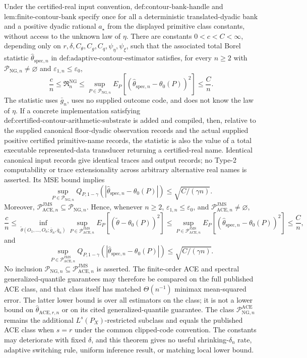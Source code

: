 Under the certified-real input convention, \(\text{def:contour-bank-handle}\) and \(\text{lem:finite-contour-bank}\) specify once for all a deterministic translated-dyadic bank and a positive dyadic rational \(a_{\star}\) from the displayed primitive class constants, without access to the unknown law of \(\eta\). There are constants \(0<c<C<\infty\), depending only on \(r,\delta,C_{\theta},C_g,C_q,\psi_{\eta},\psi_{\xi}\), such that the associated total Borel statistic \(\widehat\theta_{\mathrm{spec},n}\) in \(\text{def:adaptive-contour-estimator}\) satisfies, for every \(n\ge2\) with \(\mathcal P_{\mathrm{NG},n}\neq\varnothing\) and \(\varepsilon_{1,n}\le\varepsilon_0\),
\[
 \frac cn\le\mathfrak R_n^{\mathrm{NG}}
 \le\sup_{P\in\mathcal P_{\mathrm{NG},n}}
 E_P[(\widehat\theta_{\mathrm{spec},n}-\theta_0(P))^2]
 \le\frac Cn.
\]
The statistic uses \(\bar g_n\), uses no supplied outcome code, and does not know the law of \(\eta\). If a concrete implementation satisfying \(\text{def:certified-contour-arithmetic-substrate}\) is added and compiled, then, relative to the supplied canonical floor-dyadic observation records and the actual supplied positive certified primitive-name records, the statistic is also the value of a total executable represented-data transducer returning a certified-real name. Identical canonical input records give identical traces and output records; no Type-2 computability or trace extensionality across arbitrary alternative real names is asserted. Its MSE bound implies
\[
 \sup_{P\in\mathcal P_{\mathrm{NG},n}}
 Q_{P,1-\gamma}(|\widehat\theta_{\mathrm{spec},n}-\theta_0(P)|)
 \le\sqrt{C/(\gamma n)}.
\]
Moreover, \(\mathcal P_{\mathrm{ACE},n}^{\mathrm{JMS}}\subseteq\mathcal P_{\mathrm{NG},n}\). Hence, whenever \(n\ge2\), \(\varepsilon_{1,n}\le\varepsilon_0\), and \(\mathcal P_{\mathrm{ACE},n}^{\mathrm{JMS}}\neq\varnothing\),
\[
 \frac cn
 \le
 \inf_{\widetilde\theta(O_1,\ldots,O_n;\bar g_n,\bar q_n)}
 \sup_{P\in\mathcal P_{\mathrm{ACE},n}^{\mathrm{JMS}}}
 E_P[(\widetilde\theta-\theta_0(P))^2]
 \le
 \sup_{P\in\mathcal P_{\mathrm{ACE},n}^{\mathrm{JMS}}}
 E_P[(\widehat\theta_{\mathrm{spec},n}-\theta_0(P))^2]
 \le\frac Cn,
\]
and
\[
 \sup_{P\in\mathcal P_{\mathrm{ACE},n}^{\mathrm{JMS}}}
 Q_{P,1-\gamma}(|\widehat\theta_{\mathrm{spec},n}-\theta_0(P)|)
 \le\sqrt{C/(\gamma n)}.
\]
No inclusion \(\mathcal P_{\mathrm{NG},n}\subseteq\mathcal P_{\mathrm{ACE},n}^{\mathrm{JMS}}\) is asserted. The finite-order ACE and spectral generalized-quantile guarantees may therefore be compared on the full published ACE class, and that class itself has matched \(\Theta(n^{-1})\) minimax mean-squared error. The latter lower bound is over all estimators on the class; it is not a lower bound on \(\widehat\theta_{\mathrm{ACE},r,n}\) or on its cited generalized-quantile guarantee. The class \(\mathcal P_{\mathrm{NG},n}^{\mathrm{ACE}}\) remains the additional \(L^s(P_X)\)-restricted subclass and equals the published ACE class when \(s=r\) under the common clipped-code convention. The constants may deteriorate with fixed \(\delta\), and this theorem gives no useful shrinking-\(\delta_n\) rate, adaptive switching rule, uniform inference result, or matching local lower bound.
